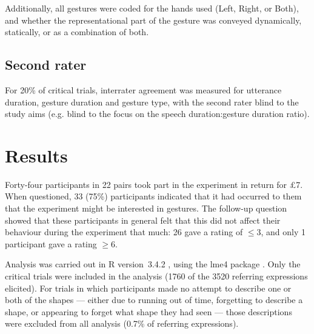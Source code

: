 \documentclass[a4paper,man,natbib]{apa6}
\begin{document}
Additionally, all gestures were coded for the hands used (Left, Right, or Both), and whether the representational part of the gesture was conveyed dynamically, statically, or as a combination of both. 

\subsection{Second rater}
For 20\% of critical trials, interrater agreement was measured for utterance duration, gesture duration and gesture type, with the second rater blind to the study aims (e.g. blind to the focus on the speech duration:gesture duration ratio).




\section{Results}
Forty-four participants in 22 pairs took part in the experiment in return for \pounds{7}.
When questioned, 33 (75\%) participants indicated that it had occurred to them that the experiment might be interested in gestures.
The follow-up question showed that these participants in general felt that this did not affect their behaviour during the experiment that much: 26 gave a rating of $\leq$3, and only 1 participant gave a rating $\geq$6. 

Analysis was carried out in R version~3.4.2 \citep{rbase}, using the lme4 package \citep{lme4}.
Only the critical trials were included in the analysis (1760 of the 3520 referring expressions elicited).
For trials in which participants made no attempt to describe one or both of the shapes --- either due to running out of time, forgetting to describe a shape, or appearing to forget what shape they had seen --- those descriptions were excluded from all analysis (0.7\% of referring expressions).
\end{document}
